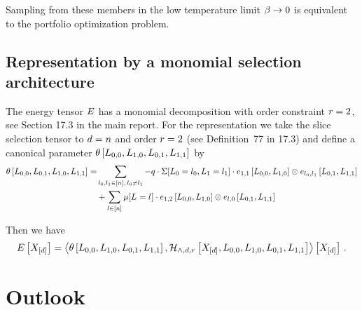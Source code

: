 \documentclass[aps,onecolumn,nofootinbib,pra]{article}
\begin{document}
Sampling from these members in the low temperature limit $\beta\rightarrow 0$ is equivalent to the portfolio optimization problem.

\subsection{Representation by a monomial selection architecture}

The energy tensor $E$ has a monomial decomposition with order constraint $r=2$, see Section 17.3 in the main report.
For the representation we take the slice selection tensor to $d=n$ and order $r=2$ (see Definition~77 in 17.3) and define a canonical parameter $\theta\left[L_{0,0},L_{1,0},L_{0,1},L_{1,1}\right]$ by 
\begin{align*}
	\theta\left[L_{0,0},L_{0,1},L_{1,0},L_{1,1}\right]
	= & \sum_{l_{0},l_{1}\in[n], \, l_{0}\neq l_{1}}	
	-q \cdot \Sigma[L_{0}=l_{0},L_{1}=l_{1}]  \cdot e_{1,1}\left[L_{0,0},L_{1,0}\right] \otimes e_{l_{0},l_{1}}\left[L_{0,1},L_{1,1}\right]\\
	& + \sum_{l\in[n]}  \mu[L_{}=l_{}] \cdot  e_{1,2}\left[L_{0,0},L_{1,0}\right] \otimes e_{l,0}\left[L_{0,1},L_{1,1}\right]
\end{align*}


Then we have
\begin{align*}
	E\left[X_{[d]}\right] 
	= \left\langle \theta\left[L_{0,0},L_{1,0},L_{0,1},L_{1,1}\right],\mathcal{H}_{\land,d,r}\left[X_{[d]},L_{0,0},L_{1,0},L_{0,1},L_{1,1}\right]\right\rangle \left[ X_{[d]} \right] \, . 
\end{align*}

\section{Outlook}
\end{document}
